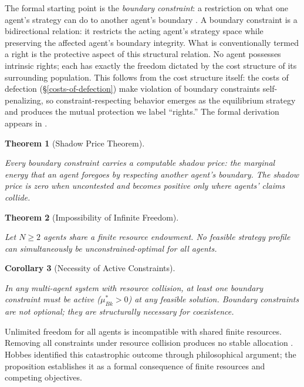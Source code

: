 \documentclass[11pt]{article}
\theoremstyle{plain}
\newtheorem{theorem}{Theorem}
\newtheorem{corollary}[theorem]{Corollary}
\theoremstyle{definition}
\theoremstyle{remark}
\begin{document}
The formal starting point is the \emph{boundary constraint}: a
restriction on what one agent's strategy can do to another agent's
boundary \citep{TC-I}. A boundary constraint is a bidirectional
relation: it restricts the acting agent's strategy space while
preserving the affected agent's boundary integrity. What is
conventionally termed a right is the protective aspect of this
structural relation. No agent possesses intrinsic rights; each has
exactly the freedom dictated by the cost structure of its surrounding
population. This follows from the cost structure itself: the costs of
defection (§\ref{costs-of-defection}) make violation of boundary
constraints self-penalizing, so constraint-respecting behavior emerges
as the equilibrium strategy and produces the mutual protection we label
``rights.'' The formal derivation appears in \citep{TC-I}.

\begin{theorem}[Shadow Price Theorem]
\label{ethics-thm-shadow-price}

Every boundary constraint carries a computable shadow price: the marginal energy that an agent foregoes by respecting another agent's boundary. The shadow price is zero when uncontested and becomes positive only where agents' claims collide. \citep{TC-I}
\end{theorem}

\begin{theorem}[Impossibility of Infinite Freedom]
\label{ethics-thm-inf-freedom}

Let $N \geq 2$ agents share a finite resource endowment. No feasible strategy profile can simultaneously be unconstrained-optimal for all agents. \citep{TC-I}
\end{theorem}

\begin{corollary}[Necessity of Active Constraints]
\label{ethics-cor-active-constraints}

In any multi-agent system with resource collision, at least one boundary constraint must be active ($\mu_{Bk}^* > 0$) at any feasible solution. Boundary constraints are not optional; they are structurally necessary for coexistence. \citep{TC-I}
\end{corollary}

Unlimited freedom for all agents is incompatible with shared finite
resources. Removing all constraints under resource collision produces no
stable allocation \citep{TC-I}. Hobbes \citep{Hobbes1651} identified
this catastrophic outcome through philosophical argument; the
proposition establishes it as a formal consequence of finite resources
and competing objectives.
\end{document}
